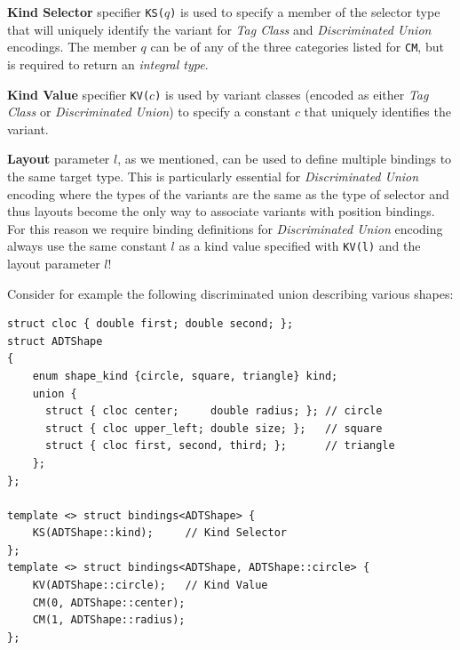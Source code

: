 \documentclass[preprint]{sigplanconf}
\makeatletter
\DeclareRobustCommand{\code}[1]{{\lstinline[breaklines=false,escapechar=@]{#1}}}
\makeatother
\begin{document}
{\bf Kind Selector} specifier \code{KS(}$q$\code{)} is used to specify a member 
of the selector type that will uniquely identify the variant for \emph{Tag 
Class} and \emph{Discriminated Union} encodings. The member $q$ can be of any of 
the three categories listed for \code{CM}, but is required to return an 
\emph{integral type}.

{\bf Kind Value} specifier \code{KV(}$c$\code{)} is used by variant classes 
(encoded as either \emph{Tag Class} or \emph{Discriminated Union}) to specify a 
constant $c$ that uniquely identifies the variant.

{\bf Layout} parameter $l$, as we mentioned, can be used to define multiple 
bindings to the same target type. This is particularly essential for 
\emph{Discriminated Union} encoding where the types of the variants are the same 
as the type of selector and thus layouts become the only way to associate 
variants with position bindings. For this reason we require binding definitions 
for \emph{Discriminated Union} encoding always use the same constant $l$ as a 
kind value specified with \code{KV(l)} and the layout parameter $l$!


Consider for example the following discriminated union describing various 
shapes:

\begin{lstlisting}[keepspaces,columns=flexible]
struct cloc { double first; double second; };
struct ADTShape
{
    enum shape_kind {circle, square, triangle} kind;
    union {
      struct { cloc center;     double radius; }; // circle
      struct { cloc upper_left; double size; };   // square
      struct { cloc first, second, third; };      // triangle
    };
};

template <> struct bindings<ADTShape> { 
    KS(ADTShape::kind);     // Kind Selector
};
template <> struct bindings<ADTShape, ADTShape::circle> {
    KV(ADTShape::circle);   // Kind Value
    CM(0, ADTShape::center);
    CM(1, ADTShape::radius);
};
\end{lstlisting}
\end{document}
